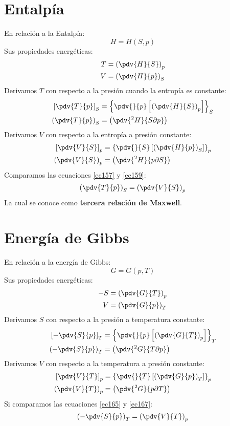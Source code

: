 \documentclass[../main]{subfiles}
\begin{document}
\section{Entalpía}
En relación a la Entalpía:
\begin{equation}
    H=H(S,p)
\end{equation}
Sus propiedades energéticas:
\begin{align}
    T & =\left( \pdv{H}{S} \right)_p \\
    V & =\left( \pdv{H}{p}\right)_S
\end{align}
Derivamos $T$ con respecto a la presión cuando la entropía es constante:
\begin{align}
    \left[ \pdv{T}{p}\right]_S & =\left\{ \pdv{}{p}\left[\left( \pdv{H}{S}\right)_p \right] \right\}_S \\
    \left( \pdv{T}{p}\right)_S & =\left( \pdv{^2 H}{S \partial p}\right)
    \label{ec157}
\end{align}
Derivamos $V$ con respecto a la entropía a presión constante:
\begin{align}
    \left[ \pdv{V}{S}\right]_p & =\left\{ \pdv{}{S}\left[\left( \pdv{H}{p}\right)_S \right] \right\}_p \\
    \left( \pdv{V}{S}\right)_p & =\left( \pdv{^2 H}{p \partial S}\right)
    \label{ec159}
\end{align}
Comparamos las ecuaciones \eqref{ec157} y \eqref{ec159}:
\begin{equation}
    \left( \pdv{T}{p}\right)_S=\left( \pdv{V}{S}\right)_p
\end{equation}
La cual se conoce como \textbf{tercera relación de Maxwell}.
\section{Energía de Gibbs}
En relación a la energía de Gibbs:
\begin{equation}
    G=G(p,T)
\end{equation}
Sus propiedades energéticas:
\begin{align}
    -S & =\left( \pdv{G}{T} \right)_p \\
    V  & =\left( \pdv{G}{p}\right)_T
\end{align}
Derivamos $S$ con respecto a la presión a temperatura constante:
\begin{align}
    \left[ -\pdv{S}{p}\right]_T & =\left\{ \pdv{}{p}\left[\left( \pdv{G}{T}\right)_p \right] \right\}_T \\
    \left(- \pdv{S}{p}\right)_T & =\left( \pdv{^2 G}{T \partial p}\right)
    \label{ec165}
\end{align}
Derivamos $V$ con respecto a la temperatura a presión constante:
\begin{align}
    \left[ \pdv{V}{T}\right]_p & =\left\{ \pdv{}{T}\left[\left( \pdv{G}{p}\right)_T \right] \right\}_p \\
    \left( \pdv{V}{T}\right)_p & =\left( \pdv{^2 G}{p \partial T}\right)
    \label{ec167}
\end{align}
Si comparamos las ecuaciones \eqref{ec165} y \eqref{ec167}:
\begin{equation}
    \left(- \pdv{S}{p}\right)_T=\left( \pdv{V}{T}\right)_p
\end{equation}
\end{document}
